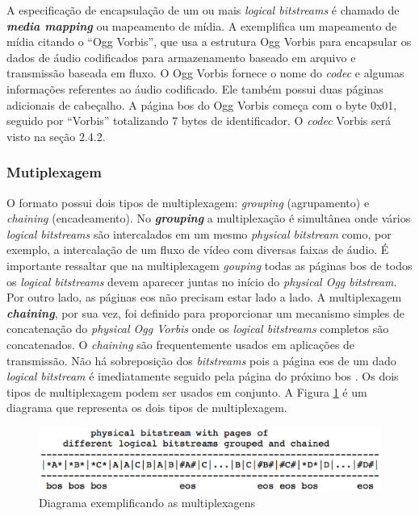 A especificação de encapsulação de um ou mais \textit{logical bitstreams} é chamado de  \textbf{\textit{media mapping}}  ou mapeamento de mídia. A \cite{ogg} exemplifica um mapeamento de mídia citando o ``Ogg Vorbis'', que usa a estrutura Ogg Vorbis para encapsular os dados de áudio codificados para armazenamento baseado em arquivo e transmissão baseada em fluxo. O Ogg Vorbis fornece o nome do \textit{codec} e algumas informações referentes ao áudio codificado. Ele também possui duas páginas adicionais de cabeçalho. A página bos do Ogg Vorbis começa com o byte 0x01, seguido por ``Vorbis'' totalizando 7 bytes de identificador. O \textit{codec} Vorbis será visto na seção 2.4.2.

\subsubsection{Mutiplexagem}

 O formato possui dois tipos de multiplexagem: \textit{grouping} (agrupamento) e \textit{chaining} (encadeamento). No \textbf{\textit{grouping}} a multiplexação é simultânea onde vários \textit{logical bitstreams} são intercalados em um mesmo \textit{physical bitstream} como, por exemplo, a intercalação de um fluxo de vídeo com diversas faixas de áudio. É importante ressaltar que na multiplexagem \textit{gouping} todas as páginas bos de todos os \textit{logical bitstreams} devem aparecer juntas no início do \textit{physical Ogg bitstream}. Por outro lado, as páginas eos não precisam estar lado a lado. A multiplexagem \textbf{\textit{chaining}}, por sua vez, foi definido para proporcionar um mecanismo simples de concatenação do \textit{physical Ogg Vorbis} onde os \textit{logical bitstreams} completos são concatenados. O \textit{chaining} são frequentemente usados em aplicações de transmissão. Não há sobreposição dos \textit{bitstreams} pois a página eos de um dado \textit{logical bitstream} é imediatamente seguido pela página do próximo bos \cite{ogg}. Os dois tipos de multiplexagem podem ser usados em conjunto. A Figura \ref{multiplexogg} é um diagrama que representa os dois tipos de multiplexagem.

 \begin{figure}[ht]
	\centering
		\includegraphics[keepaspectratio=true,scale=0.7]{figuras/multiplexogg.eps}
	\caption{Diagrama exemplificando as multiplexagens \cite{ogg}}
	\label{multiplexogg}
\end{figure}

